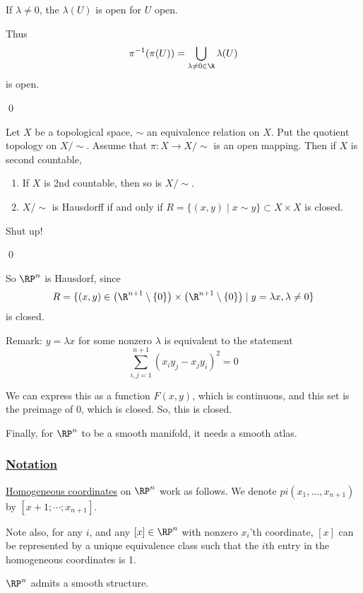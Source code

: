 \documentclass[x11names,reqno,14pt]{extarticle}
\begin{document}
If $\lambda\neq0$, the $\lambda(U)$ is open for $U$ open. 

Thus 
\[
\pi^{-1}(\pi(U)) = \bigcup_{\lambda\neq0\in \R}\lambda(U)
\]
is open.

\qed

\lem

Let $X$ be a topological space, $\sim$ an equivalence relation on $X$. Put the quotient topology on $X/\sim$. Assume that $\pi:X\to X/\sim$ is an open mapping. Then if $X$ is second countable, 
\begin{enumerate}

\item If $X$ is 2nd countable, then so is $X/\sim$. 

\item $X/\sim$ is Hausdorff if and only if $R = \{(x, y) \mid x \sim y\} \subset X\times X$ is closed. 

\end{enumerate}

\proof

Shut up!

\qed

So $\RP^n$ is Hausdorf, since 
\[
R = \{(x, y) \in \left(\R^{n + 1} \setminus \{0\}\right)\times\left(\R^{n + 1}\setminus\{0\}\right) \mid y = \lambda x, \lambda\neq0\}
\]
is closed. 

Remark: $y = \lambda x$ for some nonzero $\lambda$ is equivalent to the statement 
\[
\sum_{i, j = 1}^{n + 1}(x_iy_j - x_jy_i)^2 = 0
\]

We can express this as a function $F(x, y)$, which is continuous, and this set is the preimage of 0, which is closed. So, this is closed. 

Finally, for $\RP^n$ to be a smooth manifold, it needs a smooth atlas.

\subsubsection*{\underline{Notation}}

\underline{Homogeneous coordinates} on $\RP^n$ work as follows. We denote $pi(x_1, \dots, x_{n + 1})$ by $[x+1; \cdots ; x_{n + 1}]$. 

Note also, for any $i$, and any $[x] \in \RP^n$ with nonzero $x_i$'th coordinate, $[x]$ can be represented by a unique equivalence class such that the $i$th entry in the homogeneous coordinates is 1. 

\lem

$\RP^n$ admits a smooth structure. 
\end{document}
